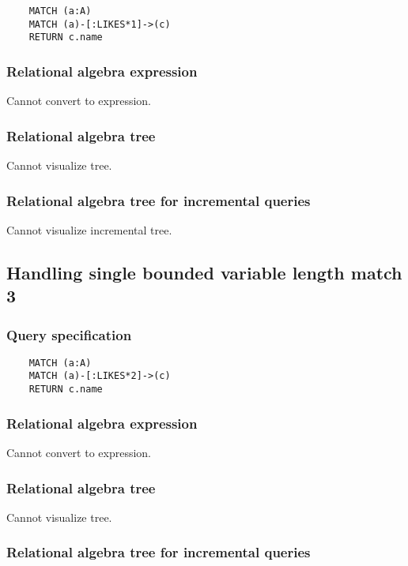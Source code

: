 	\begin{lstlisting}
	MATCH (a:A)
	MATCH (a)-[:LIKES*1]->(c)
	RETURN c.name
	\end{lstlisting}


	\subsubsection*{Relational algebra expression}

	Cannot convert to expression.

	\subsubsection*{Relational algebra tree}

	Cannot visualize tree.

	\subsubsection*{Relational algebra tree for incremental queries}

	Cannot visualize incremental tree.
	\subsection{Handling single bounded variable length match 3}

	\subsubsection*{Query specification}

	\begin{lstlisting}
	MATCH (a:A)
	MATCH (a)-[:LIKES*2]->(c)
	RETURN c.name
	\end{lstlisting}


	\subsubsection*{Relational algebra expression}

	Cannot convert to expression.

	\subsubsection*{Relational algebra tree}

	Cannot visualize tree.

	\subsubsection*{Relational algebra tree for incremental queries}

